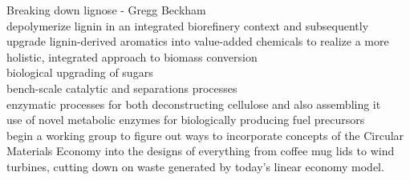 \documentclass[11pt,a4paper,sans]{moderncv}
\begin{document}
Breaking down lignose - Gregg Beckham\\
depolymerize lignin in an integrated biorefinery context and subsequently upgrade lignin-derived aromatics into value-added chemicals to realize a more holistic, integrated approach to biomass conversion\\
biological upgrading of sugars\\
bench-scale catalytic and separations processes \\
enzymatic processes for both deconstructing cellulose and also assembling it \\
use of novel metabolic enzymes for biologically producing fuel precursors\\
begin a working group to figure out ways to incorporate concepts of the Circular Materials Economy into the designs of everything from coffee mug lids to wind turbines, cutting down on waste generated by today’s linear economy model. \\






\thispagestyle{titlepage}
\end{document}
